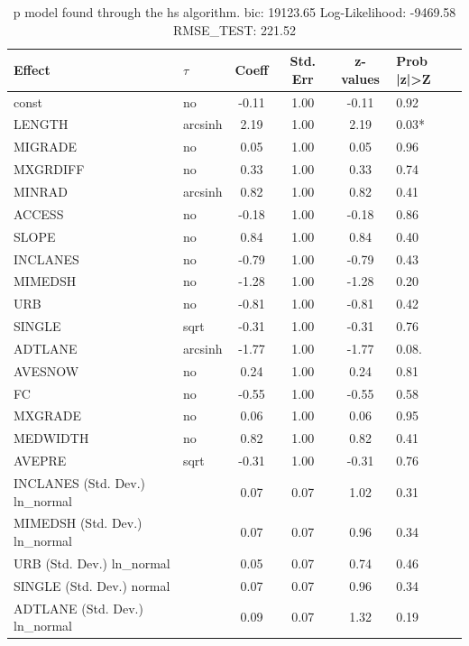 \begin{table}
	\caption{p model found through the hs algorithm. bic: 19123.65 Log-Likelihood: -9469.58 RMSE_TEST: 221.52}
	\begin{center}
		\begin{tabular}{|l|l|c|c|c|l|}
			\hline
			Effect & $\tau$ & Coeff & Std. Err & z-values & Prob |z|>Z \\
			\hline
			const & no & -0.11 & 1.00 & -0.11 & 0.92 \\
			\hline
			LENGTH & arcsinh & 2.19 & 1.00 & 2.19 & 0.03* \\
			\hline
			MIGRADE & no & 0.05 & 1.00 & 0.05 & 0.96 \\
			\hline
			MXGRDIFF & no & 0.33 & 1.00 & 0.33 & 0.74 \\
			\hline
			MINRAD & arcsinh & 0.82 & 1.00 & 0.82 & 0.41 \\
			\hline
			ACCESS & no & -0.18 & 1.00 & -0.18 & 0.86 \\
			\hline
			SLOPE & no & 0.84 & 1.00 & 0.84 & 0.40 \\
			\hline
			INCLANES & no & -0.79 & 1.00 & -0.79 & 0.43 \\
			\hline
			MIMEDSH & no & -1.28 & 1.00 & -1.28 & 0.20 \\
			\hline
			URB & no & -0.81 & 1.00 & -0.81 & 0.42 \\
			\hline
			SINGLE & sqrt & -0.31 & 1.00 & -0.31 & 0.76 \\
			\hline
			ADTLANE & arcsinh & -1.77 & 1.00 & -1.77 & 0.08. \\
			\hline
			AVESNOW & no & 0.24 & 1.00 & 0.24 & 0.81 \\
			\hline
			FC & no & -0.55 & 1.00 & -0.55 & 0.58 \\
			\hline
			MXGRADE & no & 0.06 & 1.00 & 0.06 & 0.95 \\
			\hline
			MEDWIDTH & no & 0.82 & 1.00 & 0.82 & 0.41 \\
			\hline
			AVEPRE & sqrt & -0.31 & 1.00 & -0.31 & 0.76 \\
			\hline
			INCLANES (Std. Dev.) ln_normal &  & 0.07 & 0.07 & 1.02 & 0.31 \\
			\hline
			MIMEDSH (Std. Dev.) ln_normal &  & 0.07 & 0.07 & 0.96 & 0.34 \\
			\hline
			URB (Std. Dev.) ln_normal &  & 0.05 & 0.07 & 0.74 & 0.46 \\
			\hline
			SINGLE (Std. Dev.) normal &  & 0.07 & 0.07 & 0.96 & 0.34 \\
			\hline
			ADTLANE (Std. Dev.) ln_normal &  & 0.09 & 0.07 & 1.32 & 0.19 \\

\end{tabular}
\end{center}
\end{table}
